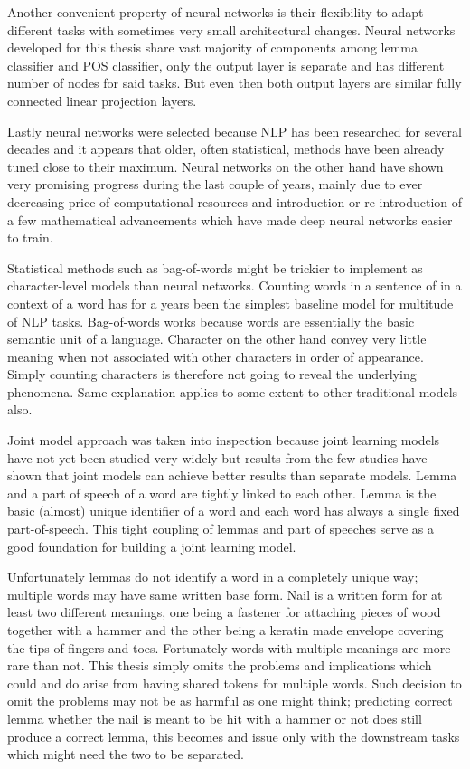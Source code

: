 \documentclass[12pt,a4paper,english
]{tutthesis}
\begin{document}
Another convenient property of neural networks is their flexibility to adapt different tasks with sometimes very small architectural changes. Neural networks developed for this thesis share vast majority of components among lemma classifier and POS classifier, only the output layer is separate and has different number of nodes for said tasks. But even then both output layers are similar fully connected linear projection layers.

Lastly neural networks were selected because NLP has been researched for several decades and it appears that older, often statistical, methods have been already tuned close to their maximum. Neural networks on the other hand have shown very promising progress during the last couple of years, mainly due to ever decreasing price of computational resources and introduction or re-introduction of a few mathematical advancements which have made deep neural networks easier to train. 

Statistical methods such as bag-of-words might be trickier to implement as character-level models than neural networks. Counting words in a sentence of in a context of a word has for a years been the simplest baseline model for multitude of NLP tasks. Bag-of-words works because words are essentially the basic semantic unit of a language. Character on the other hand convey very little meaning when not associated with other characters in order of appearance. Simply counting characters is therefore not going to reveal the underlying phenomena. Same explanation applies to some extent to other traditional models also.

Joint model approach was taken into inspection because joint learning models have not yet been studied very widely but results from the few studies have shown that joint models can achieve better results than separate models. Lemma and a part of speech of a word are tightly linked to each other. Lemma is the basic (almost) unique identifier of a word and each word has always a single fixed part-of-speech. This tight coupling of lemmas and part of speeches serve as a good foundation for building a joint learning model. 

Unfortunately lemmas do not identify a word in a completely unique way; multiple words may have same written base form. Nail is a written form for at least two different meanings, one being a fastener for attaching pieces of wood together with a hammer and the other being a keratin made envelope covering the tips of fingers and toes. Fortunately words with multiple meanings are more rare than not. This thesis simply omits the problems and implications which could and do arise from having shared tokens for multiple words. Such decision to omit the problems may not be as harmful as one might think; predicting correct lemma whether the nail is meant to be hit with a hammer or not does still produce a correct lemma, this becomes and issue only with the downstream tasks which might need the two to be separated.
\end{document}

